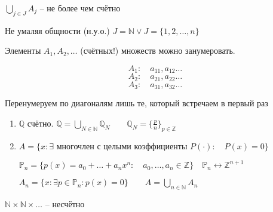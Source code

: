 \documentclass{book}
\newcommand\N{\ensuremath{\mathbb{N}}}
\newcommand\Z{\ensuremath{\mathbb{Z}}}
\newcommand\Q{\ensuremath{\mathbb{Q}}}
\theoremstyle{definition}
\begin{document}
        $\bigcup\limits_{j\in J} A_j$ -- не более чем счётно

        Не умаляя общности (н.у.о.) $J = \N \vee J = \{1, 2, \ldots, n\}$

        Элементы $A_1, A_2, \ldots$ (счётных!) множеств можно занумеровать.

        \[A_1:\quad a_{11}, a_{12} \ldots\]
        \[A_2:\quad a_{21}, a_{22} \ldots\]
        \[A_3:\quad a_{31}, a_{32} \ldots\]

        Перенумеруем по диагоналям лишь те, который встречаем в первый раз

    \begin{corollary}
        \begin{enumerate}
            \item 
                $\Q$ счётно. $\Q = \bigcup\limits_{N\in \N } \Q_N\qquad \Q_N = \{\frac{p}{n}\}_{p\in \Z }$
            \item $A = \{x: \exists \text{ многочлен с целыми коэффициенты } P(\cdot ):\quad P(x) = 0\}$

                $\mathds{P}_n = \{p(x) = a_0 + \ldots + a_nx^n:\quad a_0, \ldots, a_n\in \Z \}\quad \mathds{P}_n \leftrightarrow \Z ^{n+1}$

                $A_n = \{x:\exists p\in \mathds{P}_n: p(x) = 0\}\qquad A = \bigcup\limits_{n\in \N } A_n$
        \end{enumerate}

    \end{corollary}

    \begin{problem}
        $\N \times \N \times \ldots$ -- несчётно
    \end{problem}
\end{document}
